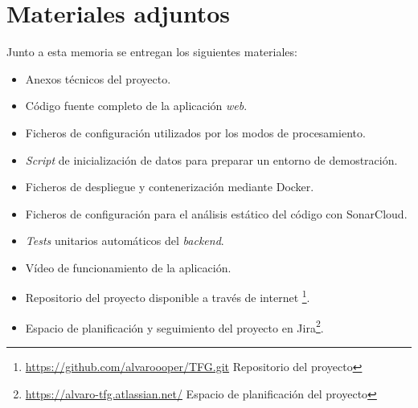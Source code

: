 \section{Materiales adjuntos}

Junto a esta memoria se entregan los siguientes materiales:

\begin{itemize}
	\item Anexos técnicos del proyecto.
	\item Código fuente completo de la aplicación \textit{web}.
	\item Ficheros de configuración utilizados por los modos de procesamiento.
	\item \textit{Script} de inicialización de datos para preparar un entorno de demostración.
	\item Ficheros de despliegue y contenerización mediante Docker.
	\item Ficheros de configuración para el análisis estático del código con SonarCloud.
	\item \textit{Tests} unitarios automáticos del \textit{backend}.
	\item Vídeo de funcionamiento de la aplicación.
	\item Repositorio del proyecto disponible a través de internet \footnote{\url{https://github.com/alvaroooper/TFG.git}{ Repositorio del proyecto}}.
	\item Espacio de planificación y seguimiento del proyecto en Jira\footnote{\url{https://alvaro-tfg.atlassian.net/}{ Espacio de planificación del proyecto}}.
	

\end{itemize}

